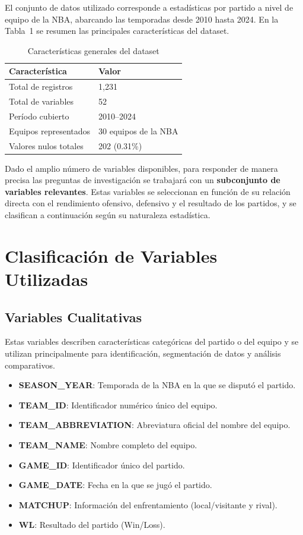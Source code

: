 \documentclass[12pt]{article}
\begin{document}
El conjunto de datos utilizado corresponde a estadísticas por partido a nivel de equipo
de la NBA, abarcando las temporadas desde 2010 hasta 2024. En la Tabla~1 se resumen
las principales características del dataset.

\begin{table}[H]
\centering
\begin{tabular}{@{}ll@{}}
\toprule
\textbf{Característica} & \textbf{Valor} \\ \midrule
Total de registros & 1,231 \\
Total de variables & 52 \\
Período cubierto & 2010--2024 \\
Equipos representados & 30 equipos de la NBA \\
Valores nulos totales & 202 (0.31\%) \\ \bottomrule
\end{tabular}
\caption{Características generales del dataset}
\end{table}

\vspace{0.3cm}

Dado el amplio número de variables disponibles, para responder de manera precisa
las preguntas de investigación se trabajará con un \textbf{subconjunto de variables relevantes}.
Estas variables se seleccionan en función de su relación directa con el rendimiento ofensivo,
defensivo y el resultado de los partidos, y se clasifican a continuación según su naturaleza
estadística.

\section{Clasificación de Variables Utilizadas}

\subsection{Variables Cualitativas}

Estas variables describen características categóricas del partido o del equipo y se utilizan
principalmente para identificación, segmentación de datos y análisis comparativos.

\begin{itemize}
    \item \textbf{SEASON\_YEAR}: Temporada de la NBA en la que se disputó el partido.
    \item \textbf{TEAM\_ID}: Identificador numérico único del equipo.
    \item \textbf{TEAM\_ABBREVIATION}: Abreviatura oficial del nombre del equipo.
    \item \textbf{TEAM\_NAME}: Nombre completo del equipo.
    \item \textbf{GAME\_ID}: Identificador único del partido.
    \item \textbf{GAME\_DATE}: Fecha en la que se jugó el partido.
    \item \textbf{MATCHUP}: Información del enfrentamiento (local/visitante y rival).
    \item \textbf{WL}: Resultado del partido (Win/Loss).
\end{itemize}
\end{document}
